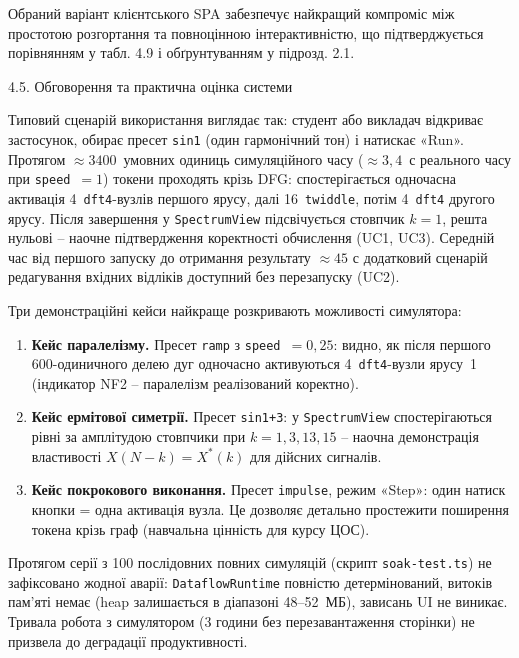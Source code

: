 \documentclass[
]{article}
\begin{document}
\protect{}\label{_Toc229681182}{}Обраний варіант
клієнтського SPA забезпечує найкращий компроміс між простотою
розгортання та повноцінною інтерактивністю, що підтверджується
порівнянням у табл. 4.9 і обґрунтуванням у підрозд. 2.1.

4.5. Обговорення та практична оцінка системи

Типовий сценарій використання виглядає так: студент або викладач
відкриває застосунок, обирає пресет \texttt{sin1} (один гармонічний тон)
і натискає «Run». Протягом \(\approx 3400\)~умовних одиниць
симуляційного часу (\(\approx 3,4\)~с реального часу при
\texttt{speed}~\(= 1\)) токени проходять крізь DFG: спостерігається
одночасна активація 4~\texttt{dft4}-вузлів першого ярусу, далі
16~\texttt{twiddle}, потім 4~\texttt{dft4} другого ярусу. Після
завершення у \texttt{SpectrumView} підсвічується стовпчик \(k = 1\),
решта нульові -- наочне підтвердження коректності обчислення (UC1, UC3).
Середній час від першого запуску до отримання результату \(\approx 45\)
с додатковий сценарій редагування вхідних відліків доступний без
перезапуску (UC2).

Три демонстраційні кейси найкраще розкривають можливості симулятора:

\begin{enumerate}
\def\labelenumi{\arabic{enumi}.}
\item
  \textbf{Кейс паралелізму.} Пресет \texttt{ramp} з
  \texttt{speed}~\(= 0,25\): видно, як після першого 600-одиничного
  делею дуг одночасно активуються 4~\texttt{dft4}-вузли ярусу~1
  (індикатор NF2 -- паралелізм реалізований коректно).
\item
  \textbf{Кейс ермітової симетрії.} Пресет \texttt{sin1+3}: у
  \texttt{SpectrumView} спостерігаються рівні за амплітудою стовпчики
  при \(k = 1,3,13,15\) -- наочна демонстрація властивості
  \(X(N - k) = X^{*}(k)\) для дійсних сигналів.
\item
  \textbf{Кейс покрокового виконання.} Пресет \texttt{impulse}, режим
  «Step»: один натиск кнопки = одна активація вузла. Це дозволяє
  детально простежити поширення токена крізь граф (навчальна цінність
  для курсу ЦОС).
\end{enumerate}

Протягом серії з 100 послідовних повних симуляцій (скрипт
\texttt{soak-test.ts}) не зафіксовано жодної аварії:
\texttt{DataflowRuntime} повністю детермінований, витоків пам'яті немає
(heap залишається в діапазоні 48--52~МБ), зависань UI не виникає.
Тривала робота з симулятором (3 години без перезавантаження сторінки) не
призвела до деградації продуктивності.
\end{document}
